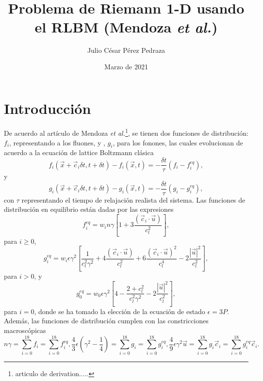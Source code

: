 \documentclass{article}
\title{Problema de Riemann 1-D usando el RLBM (Mendoza \textit{et al.})}
\author{Julio César Pérez Pedraza}
\date{Marzo de 2021}
\begin{document}
\maketitle

\section{Introducción}
De acuerdo al artículo de Mendoza \textit{et al.}\footnote{articulo de derivation.....}, se tienen dos funciones de distribución: $f_i$, representando a los fluones,  y , $g_i$, para los fonones, las cuales evolucionan de acuerdo a la ecuación de lattice Boltzmann clásica
\begin{equation}
    f_i(\vec{x} + \vec{c}_i\delta t, t + \delta t) -f_i (\vec{x}, t) = - \frac{\delta t}{\tau} (f_i - f_i^{eq}),
\end{equation}
y
\begin{equation}
    g_i(\vec{x} + \vec{c}_i\delta t, t + \delta t) -g_i (\vec{x}, t) = - \frac{\delta t}{\tau} (g_i - g_i^{eq}),
\end{equation}
con $\tau$ representando el tiempo de relajación realista del sistema. Las funciones de distribución en equilibrio están dadas por las expresiones
   \begin{equation}
     f_i^{eq} = w_i n\gamma\left[ 1+3 \frac{(\vec{c}_i\cdot \vec{u})}{c_l^2} \right], 
 \end{equation}
 para $i\geq 0$, 
 \begin{equation}
     g_i^{eq} = w_i\epsilon\gamma^2\left[ \frac{1}{c_l^2\gamma^2}+4 \frac{(\vec{c}_i\cdot \vec{u})}{c_l^2}+ 6 \frac{(\vec{c}_i\cdot \vec{u})^2}{c_l^4}-2\frac{|\vec{u}|^2}{c_l^2} \right], 
 \end{equation}
  para $i> 0$, y
   \begin{equation}
     g_0^{eq} = w_0\epsilon\gamma^2\left[4- \frac{2+c_l^2}{c_l^2\gamma^2}-2\frac{|\vec{u}|^2}{c_l^2} \right], 
 \end{equation}
 para $i=0$, donde se ha tomado la elección de la ecuación de estado $\epsilon=3P$. Además, las funciones de distribución cumplen con las constricciones macroscópicas
 \begin{subequations}
\begin{equation}
    n\gamma = \sum_{i=0}^{18} f_i = \sum_{i=0}^{18} f_i^{eq}, 
\end{equation}
\begin{equation}
    \frac{4}{3}\epsilon (\gamma^2-\frac{1}{4}) = \sum_{i=0}^{18} g_i = \sum_{i=0}^{18} g_i^{eq}, 
\end{equation}
\begin{equation}
    \frac{4}{9} \epsilon \gamma^2 \vec{u} = \sum_{i=0}^{18} g_i \vec{c}_i = \sum_{i=0}^{18} g_i^{eq} \vec{c}_i. 
\end{equation}
\end{subequations}
\end{document}
